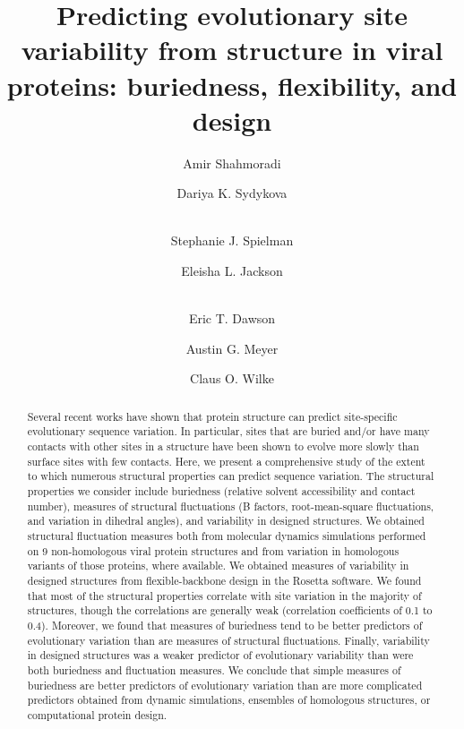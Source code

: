 \documentclass[smallextended]{svjour3}
\begin{document}
\title{Predicting evolutionary site variability from structure in viral proteins: buriedness, flexibility, and design}

\author{Amir Shahmoradi \and Dariya K. Sydykova \and \\ Stephanie J. Spielman \and Eleisha L. Jackson \and \\ Eric T. Dawson \and Austin G. Meyer \and Claus O. Wilke}


\date{}

\maketitle

\begin{abstract}
Several recent works have shown that protein structure can predict site-specific evolutionary sequence variation. In particular, sites that are buried and/or have many contacts with other sites in a structure have been shown to evolve more slowly than surface sites with few contacts. Here, we present a comprehensive study of the extent to which numerous structural properties can predict sequence variation. The structural properties we consider include buriedness (relative solvent accessibility and contact number), measures of structural fluctuations (B factors, root-mean-square fluctuations, and variation in dihedral angles), and variability in designed structures. We obtained structural fluctuation measures both from molecular dynamics simulations performed on 9 non-homologous viral protein structures and from variation in homologous variants of those proteins, where available. We obtained measures of variability in designed structures from flexible-backbone design in the Rosetta software. We found that most of the structural properties correlate with site variation in the majority of structures, though the correlations are generally weak (correlation coefficients of 0.1 to 0.4). Moreover, we found that measures of buriedness tend to be better predictors of evolutionary variation than are measures of structural fluctuations. Finally, variability in designed structures was a weaker predictor of evolutionary variability than were both buriedness and fluctuation measures. We conclude that simple measures of buriedness are better predictors of evolutionary variation than are more complicated predictors obtained from dynamic simulations, ensembles of homologous structures, or computational protein design.
\end{abstract}
\end{document}
